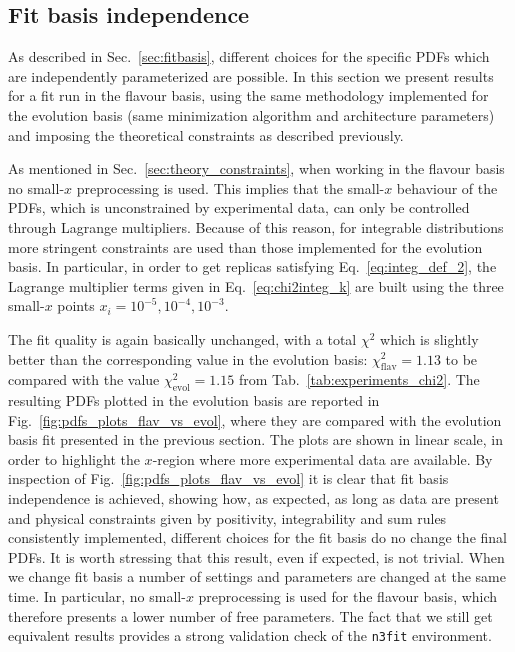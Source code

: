 \subsection{Fit basis independence}
As described in Sec.~\ref{sec:fitbasis}, different choices for the specific PDFs which are independently
parameterized are possible.
In this section we present results for a fit run in the flavour basis, using the same methodology
implemented for the evolution basis (same minimization algorithm and architecture parameters) 
and imposing the theoretical constraints as described previously.

%
As mentioned in Sec.~\ref{sec:theory_constraints}, when working in the flavour basis 
no small-$x$ preprocessing is used. This implies that the small-$x$ behaviour of the PDFs, which is unconstrained 
by experimental data, can only be controlled through Lagrange multipliers.
Because of this reason, for integrable distributions more stringent constraints are used than those implemented
for the evolution basis. In particular, in order to get replicas satisfying Eq.~\eqref{eq:integ_def_2},
the Lagrange multiplier terms given in Eq.~\eqref{eq:chi2integ_k} are built using the three small-$x$
points $x_i = 10^{-5}, 10^{-4}, 10^{-3}$. 

%
The fit quality is again basically unchanged, with a total $\chi^2$ which is slightly better than the corresponding 
value in the evolution basis: $\chi_{\text{flav}}^2=1.13$ to be compared with the value $\chi_{\text{evol}}^2=1.15$ 
from Tab.~\ref{tab:experiments_chi2}.
The resulting PDFs plotted in the evolution basis are reported in Fig.~\ref{fig:pdfs_plots_flav_vs_evol}, 
where they are compared with the evolution basis fit presented in the previous section.
The plots are shown in linear scale, in order to highlight the $x$-region where more experimental data are available.
By inspection of Fig.~\ref{fig:pdfs_plots_flav_vs_evol} it is clear that fit basis independence is achieved,
showing how, as expected, as long as data are present and physical constraints given by positivity, integrability and sum rules
consistently implemented, different choices for the fit basis do no change the final PDFs.
It is worth stressing that this result, even if expected, is not trivial. When we change fit basis a number
of settings and parameters are changed at the same time. In particular, no small-$x$ preprocessing
is used for the flavour basis, which therefore presents a lower number of free parameters.
The fact that we still get equivalent results provides a strong validation check of the {\tt n3fit} environment.

